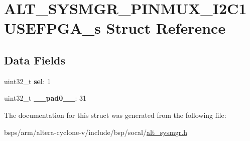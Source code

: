 \hypertarget{structALT__SYSMGR__PINMUX__I2C1USEFPGA__s}{}\section{A\+L\+T\+\_\+\+S\+Y\+S\+M\+G\+R\+\_\+\+P\+I\+N\+M\+U\+X\+\_\+\+I2\+C1\+U\+S\+E\+F\+P\+G\+A\+\_\+s Struct Reference}
\label{structALT__SYSMGR__PINMUX__I2C1USEFPGA__s}
\subsection*{Data Fields}
\begin{DoxyCompactItemize}
\item 
\mbox{\label{structALT__SYSMGR__PINMUX__I2C1USEFPGA__s_a02ee9cea34bae681b7df101f10d6133e}} 
uint32\+\_\+t {\bfseries sel}\+: 1
\item 
\mbox{\label{structALT__SYSMGR__PINMUX__I2C1USEFPGA__s_a9e35493a787a37f2dd25509a9c352ed8}} 
uint32\+\_\+t {\bfseries \+\_\+\+\_\+pad0\+\_\+\+\_\+}\+: 31
\end{DoxyCompactItemize}


The documentation for this struct was generated from the following file\+:\begin{DoxyCompactItemize}
\item 
bsps/arm/altera-\/cyclone-\/v/include/bsp/socal/\mbox{\hyperlink{alt__sysmgr_8h}{alt\+\_\+sysmgr.\+h}}\end{DoxyCompactItemize}
